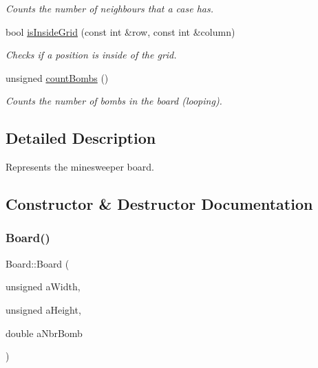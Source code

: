 \begin{DoxyCompactItemize}
\begin{DoxyCompactList}\small\item\em Counts the number of neighbours that a case has. \end{DoxyCompactList}\item 
bool \hyperlink{class_board_acfe30fe7eede25b2fec132e7f89cb270}{is\+Inside\+Grid} (const int \&row, const int \&column)
\begin{DoxyCompactList}\small\item\em Checks if a position is inside of the grid. \end{DoxyCompactList}\item 
\mbox{\label{class_board_ada5eae4dbed658da0db0663dc62277aa}} 
unsigned \hyperlink{class_board_ada5eae4dbed658da0db0663dc62277aa}{count\+Bombs} ()
\begin{DoxyCompactList}\small\item\em Counts the number of bombs in the board (looping). \end{DoxyCompactList}\end{DoxyCompactItemize}


\subsection{Detailed Description}
Represents the minesweeper board. 

\subsection{Constructor \& Destructor Documentation}
\mbox{\label{class_board_a54307d1cc6a6ae03b097dc20040bbf4e}} 
\subsubsection{\texorpdfstring{Board()}{Board()}\hspace{0.1cm}{\footnotesize\ttfamily [1/2]}}
{\footnotesize\ttfamily Board\+::\+Board (\begin{DoxyParamCaption}\item[{unsigned}]{a\+Width,  }\item[{unsigned}]{a\+Height,  }\item[{double}]{a\+Nbr\+Bomb }\end{DoxyParamCaption})}



